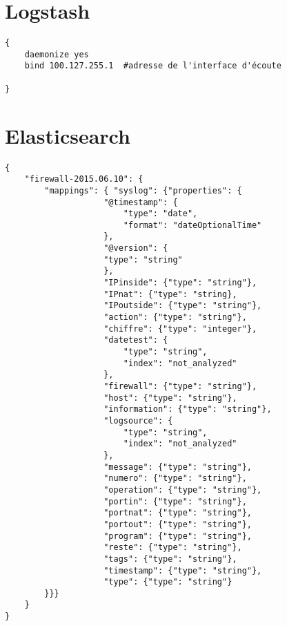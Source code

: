 \section{Logstash}
\begin{lstlisting}[style=code,label={lst:configredis},caption={configuration dans /etc/redis/redis.conf}]
{
    daemonize yes
    bind 100.127.255.1  #adresse de l'interface d'écoute

}
\end{lstlisting}

\section{Elasticsearch}
\begin{lstlisting}[style=code,label={lst:mappingresult},caption={Exemple de mapping}]
{
    "firewall-2015.06.10": {
        "mappings": { "syslog": {"properties": {
                    "@timestamp": {
                        "type": "date",
                        "format": "dateOptionalTime"
                    },
                    "@version": {
                    "type": "string"
                    },
                    "IPinside": {"type": "string"},
                    "IPnat": {"type": "string},
                    "IPoutside": {"type": "string"},
                    "action": {"type": "string"},
                    "chiffre": {"type": "integer"},
                    "datetest": {
                        "type": "string",
                        "index": "not_analyzed"
                    },
                    "firewall": {"type": "string"},
                    "host": {"type": "string"},
                    "information": {"type": "string"},
                    "logsource": {
                        "type": "string",
                        "index": "not_analyzed"
                    },
                    "message": {"type": "string"},
                    "numero": {"type": "string"},
                    "operation": {"type": "string"},
                    "portin": {"type": "string"},
                    "portnat": {"type": "string"},
                    "portout": {"type": "string"},
                    "program": {"type": "string"},
                    "reste": {"type": "string"},
                    "tags": {"type": "string"},
                    "timestamp": {"type": "string"},
                    "type": {"type": "string"}
        }}}
    }
}
\end{lstlisting}
\label{lst:mappingresult}

